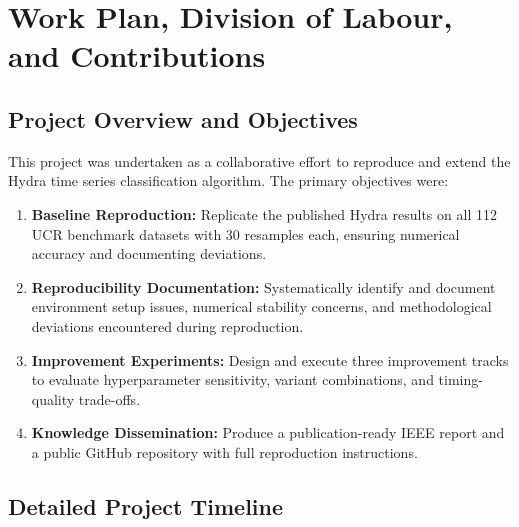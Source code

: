 \documentclass[conference]{IEEEtran}
\begin{document}
\vspace{12pt}

\newpage
\section*{Work Plan, Division of Labour, and Contributions}

\subsection*{Project Overview and Objectives}

This project was undertaken as a collaborative effort to reproduce and extend
the Hydra time series classification algorithm. The primary objectives were:

\begin{enumerate}
  \item \textbf{Baseline Reproduction:} Replicate the published Hydra results
        on all 112 UCR benchmark datasets with 30 resamples each, ensuring
        numerical accuracy and documenting deviations.
  \item \textbf{Reproducibility Documentation:} Systematically identify and
        document environment setup issues, numerical stability concerns, and
        methodological deviations encountered during reproduction.
  \item \textbf{Improvement Experiments:} Design and execute three improvement
        tracks to evaluate hyperparameter sensitivity, variant combinations,
        and timing-quality trade-offs.
  \item \textbf{Knowledge Dissemination:} Produce a publication-ready IEEE
        report and a public GitHub repository with full reproduction
        instructions.
\end{enumerate}

\subsection*{Detailed Project Timeline}
\end{document}
